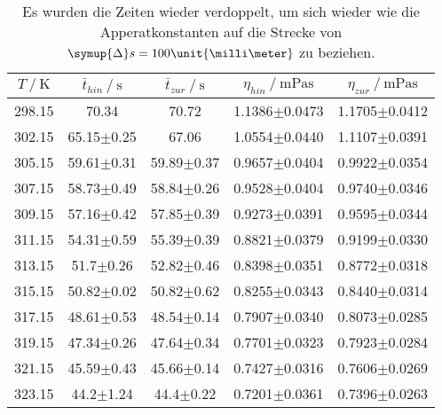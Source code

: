 \begin{table}
  \centering
  \caption{Es wurden die Zeiten wieder verdoppelt, um sich wieder wie die Apperatkonstanten auf die Strecke von $\symup{\Delta}s=100\unit{\milli\meter}$ zu beziehen.}
  \begin{tabular}{ccccc}
    \toprule
    {$T \mathbin{/} \unit{\kelvin}$} &
    {$\bar{t}_{hin} \mathbin{/} \unit{\second}$} &
    {$\bar{t}_{zur} \mathbin{/} \unit{\second}$} &
    {$\eta_{hin} \mathbin{/} \unit{\milli\pascal\second}$} &
    {$\eta_{zur} \mathbin{/} \unit{\milli\pascal\second}$} \\
    \midrule
    298.15 & 70.34          & 70.72          & 1.1386$\pm$0.0473 & 1.1705$\pm$0.0412 \\
    302.15 & 65.15$\pm$0.25 & 67.06          & 1.0554$\pm$0.0440 & 1.1107$\pm$0.0391 \\
    305.15 & 59.61$\pm$0.31 & 59.89$\pm$0.37 & 0.9657$\pm$0.0404 & 0.9922$\pm$0.0354 \\
    307.15 & 58.73$\pm$0.49 & 58.84$\pm$0.26 & 0.9528$\pm$0.0404 & 0.9740$\pm$0.0346 \\
    309.15 & 57.16$\pm$0.42 & 57.85$\pm$0.39 & 0.9273$\pm$0.0391 & 0.9595$\pm$0.0344 \\
    311.15 & 54.31$\pm$0.59 & 55.39$\pm$0.39 & 0.8821$\pm$0.0379 & 0.9199$\pm$0.0330 \\
    313.15 & 51.7$\pm$0.26  & 52.82$\pm$0.46 & 0.8398$\pm$0.0351 & 0.8772$\pm$0.0318 \\
    315.15 & 50.82$\pm$0.02 & 50.82$\pm$0.62 & 0.8255$\pm$0.0343 & 0.8440$\pm$0.0314 \\
    317.15 & 48.61$\pm$0.53 & 48.54$\pm$0.14 & 0.7907$\pm$0.0340 & 0.8073$\pm$0.0285 \\
    319.15 & 47.34$\pm$0.26 & 47.64$\pm$0.34 & 0.7701$\pm$0.0323 & 0.7923$\pm$0.0284 \\
    321.15 & 45.59$\pm$0.43 & 45.66$\pm$0.14 & 0.7427$\pm$0.0316 & 0.7606$\pm$0.0269 \\
    323.15 & 44.2$\pm$1.24  & 44.4$\pm$0.22  & 0.7201$\pm$0.0361 & 0.7396$\pm$0.0263 \\
    \bottomrule
  \end{tabular}
  \label{tab:Tabelle3}
\end{table}
